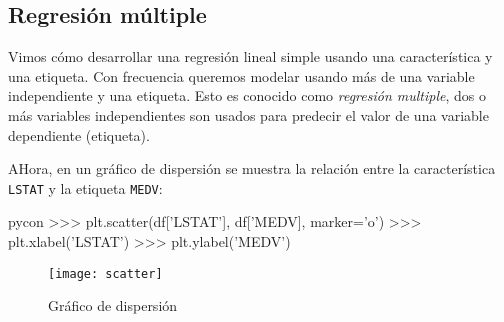 \subsection{Regresión múltiple}
Vimos cómo desarrollar una regresión lineal simple usando una característica y una etiqueta. Con frecuencia queremos modelar usando más de una variable independiente y una etiqueta. Esto es conocido como \emph{regresión multiple}, dos o más variables independientes son usados para predecir el valor de una variable dependiente (etiqueta).

AHora, en un gráfico de dispersión se muestra la relación entre la característica \texttt{LSTAT} y la etiqueta \texttt{MEDV}:
\begin{pygments}{pycon}
>>> plt.scatter(df['LSTAT'], df['MEDV], marker='o')
>>> plt.xlabel('LSTAT')
>>> plt.ylabel('MEDV')
\end{pygments}

\begin{figure}[ht!]
	\centering
	\texttt{[image: scatter]}
	\caption{\label{fig:matlpotlib}Gráfico de dispersión}
\end{figure}